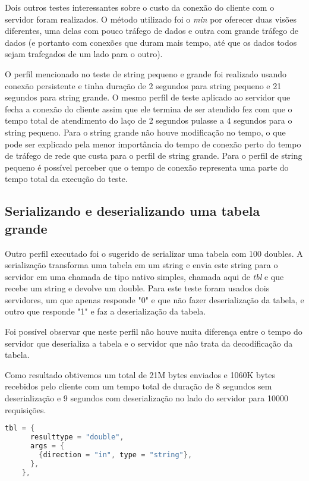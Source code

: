 \documentclass[11pt]{article}
\begin{document}
Dois outros testes interessantes sobre o custo da conexão do cliente com o
servidor foram realizados. O método utilizado foi o \textit{min} por oferecer
duas visões diferentes, uma delas com pouco tráfego de dados e outra com grande
tráfego de dados (e portanto com conexões que duram mais tempo, até que os dados
todos sejam trafegados de um lado para o outro).

O perfil mencionado no teste de string pequeno e grande foi realizado usando
conexão persistente e tinha duração de 2 segundos para string pequeno e 21
segundos para string grande. O mesmo perfil de teste aplicado ao servidor que fecha a conexão do cliente
assim que ele termina de ser atendido fez com que o tempo total de atendimento
do laço de 2 segundos pulasse a 4 segundos para o string pequeno. Para
o string grande não houve modificação no tempo, o que pode ser explicado pela
menor importância do tempo de conexão perto do tempo de tráfego de rede que
custa para o perfil de string grande. Para o perfil de string pequeno é possível
perceber que o tempo de conexão representa uma parte do tempo total da execução
do teste.

\subsection{Serializando e deserializando uma tabela grande}\label{subsec:serdeser}

Outro perfil executado foi o sugerido de serializar uma tabela com 100 doubles.
A serialização transforma uma tabela em um string e envia este string para o
servidor em uma chamada de tipo nativo simples, chamada aqui de \textit{tbl} e
que recebe um string e devolve um double. Para este teste foram usados dois
servidores, um que apenas responde "0" e que não fazer deserialização da tabela,
e outro que responde "1" e faz a deserialização da tabela.

Foi possível observar que neste perfil não houve muita diferença entre o tempo
do servidor que deserializa a tabela e o servidor que não trata da decodificação
da tabela.

Como resultado obtivemos um total de 21M bytes enviados e 1060K bytes recebidos pelo
cliente com um tempo total de duração de 8 segundos sem deserialização e 9
segundos com deserialização no lado do servidor para 10000 requisições.

\begin{lstlisting}[label={ifacetbl},language=C,caption=Interface tbl]
    tbl = {
      resulttype = "double",
      args = {
        {direction = "in", type = "string"},
      },
    },
\end{lstlisting}
\end{document}
